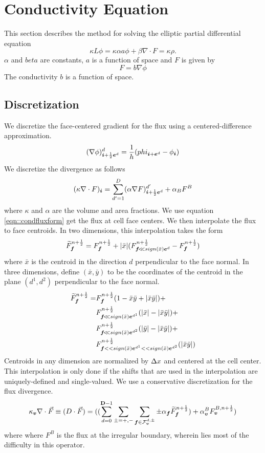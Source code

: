 
\section{Conductivity Equation}
This section describes the method for solving the elliptic partial
differential equation
$$
\kappa L \phi = \kappa \alpha a \phi + \beta \nabla \cdot F = \kappa \rho.
$$
$\alpha$ and $beta$ are constants, $a$ is a function of space and $F$ is given by 
\begin{equation}
F = b \nabla \phi
\label{eqn::condfluxform}
\end{equation}
The conductivity $b$ is a function of space.

\subsection{Discretization}

We discretize the face-centered gradient  for the flux using 
a centered-difference approximation.
$$
(\nabla \phi)^{d}_{{\boldsymbol{i}} + \frac{1}{2} {\boldsymbol{e}}^d} =  \frac{1}{h}(phi_{{\boldsymbol{i}}+ {\boldsymbol{e}}^d}  -\phi_{{\boldsymbol{i}}})
$$
We discretize the divergence as follows
$$
(\kappa \nabla \cdot F)_{{\boldsymbol{i}}} = \sum\limits^{D}_{d'=1} 
(\alpha \nabla F)^{d'}_{{\boldsymbol{i}} + \frac{1}{2} {\boldsymbol{e}}^d} + \alpha_B F^B
$$
where $\kappa$ and $\alpha$ are the volume and area fractions.
We use equation \ref{eqn::condfluxform} get the flux at cell face
centers.   We then interpolate the flux to face centroids.
In two dimensions, this interpolation takes the form
\begin{gather}
\widetilde{F}^{n + \frac{1}{2}}_{\boldsymbol{f}} = 
F^{n + \frac{1}{2}}_{\boldsymbol{f}}  + |\bar x| 
(F^{n + \frac{1}{2}}_{{{\boldsymbol{f}}} \! < \!\! < \! {\,sign(\bar x) {\boldsymbol{e}}^d}}-F^{n + \frac{1}{2}}_{\boldsymbol{f}}) 
\end{gather}
where $\bar x$ is the centroid in the direction $d$ perpendicular to the
face normal. In three dimensions, define $(\bar x, \bar y)$ to be the
coordinates of the centroid in the plane $(d^1, d^2)$ perpendicular 
to the face normal. 
\begin{align}
\widetilde{F}^\nph_\fbold =& 
F^\nph_\fbold( 1 -\bar x \bar y + |\bar x \bar y | ) + \\
&F^\nph_{\ebshift{\fbold}{\,sign(\bar x) \ebold^{d^1}}} 
(|\bar x| - |\bar x \bar y|) + \\
&F^\nph_{\ebshift{\fbold}{\,sign(\bar x) \ebold^{d^2}}} 
(|\bar y| - |\bar x \bar y|) + \\
&F^\nph_{\fbold << sign(\bar x) \ebold^{d^1} << sign(\bar x)
\ebold^{d^2}}  (|\bar x \bar y |)
\end{align}
Centroids in any dimension are normalized by $\Delta x$ and centered at the
cell center.   This interpolation is only done if the shifts that are
used in the interpolation are uniquely-defined and single-valued.
We use a conservative discretization for the flux divergence.
\begin{gather}
\kappa_{\boldsymbol{v}} \nabla \cdot \vec{F} \equiv (D \cdot \vec{F}) = 
((\sum^{{\mathbf{D}}-1}_{d=0} \sum_{\pm = +,-} \sum_{{\boldsymbol{f}} \in
\mathcal{F}^{d, \pm}_{\boldsymbol{v}}} \pm \alpha_{\boldsymbol{f}} \widetilde{F}^{n + \frac{1}{2}}_{\boldsymbol{f}}) +
\alpha^B_{\boldsymbol{v}} F^{B, {n + \frac{1}{2}}}_{\boldsymbol{v}}) 
\end{gather}
where 
where $F^B$ is the flux at the irregular boundary, wherein lies most
of the difficulty in this operator.

